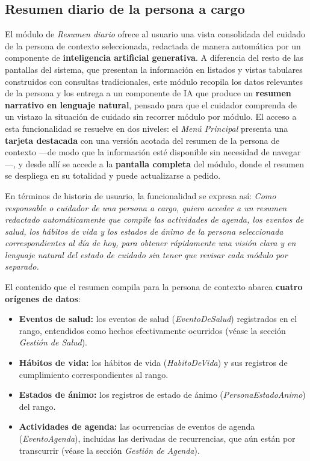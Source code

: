 \documentclass[a4paper,12pt]{article}
\begin{document}
    \subsection{Resumen diario de la persona a cargo}
    \par El módulo de \textit{Resumen diario} ofrece al usuario una vista consolidada del cuidado de la persona de contexto seleccionada, redactada de manera automática por un componente de \textbf{inteligencia artificial generativa}. A diferencia del resto de las pantallas del sistema, que presentan la información en listados y vistas tabulares construidos con consultas tradicionales, este módulo recopila los datos relevantes de la persona y los entrega a un componente de IA que produce un \textbf{resumen narrativo en lenguaje natural}, pensado para que el cuidador comprenda de un vistazo la situación de cuidado sin recorrer módulo por módulo. El acceso a esta funcionalidad se resuelve en dos niveles: el \textit{Menú Principal} presenta una \textbf{tarjeta destacada} con una versión acotada del resumen de la persona de contexto —de modo que la información esté disponible sin necesidad de navegar—, y desde allí se accede a la \textbf{pantalla completa} del módulo, donde el resumen se despliega en su totalidad y puede actualizarse a pedido.
    \par En términos de historia de usuario, la funcionalidad se expresa así: \textit{Como responsable o cuidador de una persona a cargo, quiero acceder a un resumen redactado automáticamente que compile las actividades de agenda, los eventos de salud, los hábitos de vida y los estados de ánimo de la persona seleccionada correspondientes al día de hoy, para obtener rápidamente una visión clara y en lenguaje natural del estado de cuidado sin tener que revisar cada módulo por separado.}
    \par El contenido que el resumen compila para la persona de contexto abarca \textbf{cuatro orígenes de datos}:
    \begin{itemize}
        \item \textbf{Eventos de salud:} los eventos de salud (\textit{EventoDeSalud}) registrados en el rango, entendidos como hechos efectivamente ocurridos (véase la sección \textit{Gestión de Salud}).
        \item \textbf{Hábitos de vida:} los hábitos de vida (\textit{HabitoDeVida}) y sus registros de cumplimiento correspondientes al rango.
        \item \textbf{Estados de ánimo:} los registros de estado de ánimo (\textit{PersonaEstadoAnimo}) del rango.
        \item \textbf{Actividades de agenda:} las ocurrencias de eventos de agenda (\textit{EventoAgenda}), incluidas las derivadas de recurrencias, que aún están por transcurrir (véase la sección \textit{Gestión de Agenda}).
    \end{itemize}
\end{document}
